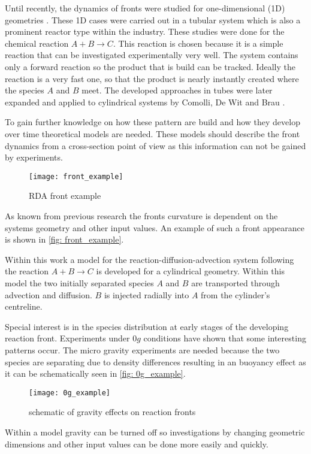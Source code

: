 \documentclass[../thesis.tex]{subfiles}
\begin{document}
Until recently, the dynamics of fronts were studied for one-dimensional (1D) geometries \cite{PhysRevA.38.3151, nunge1969mechanisms}. These 1D cases were carried out in a tubular system which is also a prominent reactor type within the industry. These studies were done for the chemical reaction $ A+B \rightarrow C$. This reaction is chosen because it is a simple reaction that can be investigated experimentally very well. The system contains only a forward reaction so the product that is build can be tracked. Ideally the reaction is a very fast one, so that the product is nearly instantly created where the species $A$ and $B$ meet. The developed approaches in tubes were later expanded and applied to cylindrical systems by Comolli, De Wit and Brau \cite{comolli2021dynamics}.

To gain further knowledge on how these pattern are build and how they develop over time theoretical models are needed. These models should describe the front dynamics from a cross-section point of view as this information can not be gained by experiments. 
\begin{figure}[htbp]
	\centering
	\texttt{[image: front\_example]}
	\caption{RDA front example}
	\label{fig: front_example}
\end{figure}
As known from previous research the fronts curvature is dependent on the systems geometry and other input values. An example of such a front appearance is shown in \autoref{fig: front_example}.

Within this work a model for the reaction-diffusion-advection system following the reaction $ A+B \rightarrow C$ is developed for a cylindrical geometry. Within this model the two initially separated species $A$ and $B$ are transported through advection and diffusion. $B$ is injected radially into $A$ from the cylinder's centreline. 

Special interest is in the species distribution at early stages of the developing reaction front. Experiments under $0g$ conditions have shown that some interesting patterns occur. The micro gravity experiments are needed because the two species are separating due to density differences resulting in an buoyancy effect as it can be schematically seen in \autoref{fig: 0g_example}.
\begin{figure}[htbp]
	\centering
	\texttt{[image: 0g\_example]}
	\caption{schematic of gravity effects on reaction fronts \cite{stergiou2022effects}}
	\label{fig: 0g_example}
\end{figure}
Within a model gravity can be turned off so investigations by changing geometric dimensions and other input values can be done more easily and quickly.
\end{document}
